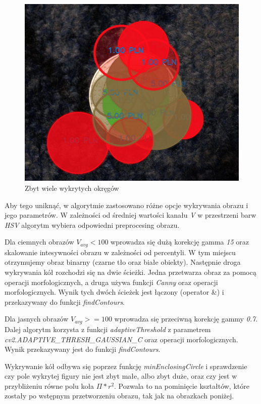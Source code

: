 \documentclass{mwart}
\begin{document}
\begin{figure}[H]
    \centering
    \includegraphics[width=\textwidth]{Objects.png}
    \caption{Zbyt wiele wykrytych okręgów}
\end{figure}

Aby tego uniknąć, w algorytmie zastosowano różne opcje wykrywania obrazu i jego parametrów. W zależności od średniej wartości kanału \textit{V} w przestrzeni barw \textit{HSV} algorytm wybiera odpowiedni preprocesing obrazu.

Dla ciemnych obrazów $V_{avg} < 100$ wprowadza się dużą korekcję gamma \textit{15} oraz skalowanie intesywności obrazu w zależności od percentyli.
W tym miejscu otrzymujemy obraz binarny (czarne tło oraz białe obiekty).
Następnie droga wykrywania kół rozchodzi się na dwie ścieżki. Jedna przetwarza obraz za pomocą operacji morfologicznych, a druga używa funkcji \textit{Canny} oraz operacji morfologicznych. Wynik tych dwóch ścieżek jest łączony (operator \&) i przekazywany do funkcji \textit{findContours}.

Dla jasnych obrazów $V_{avg} >= 100$ wprowadza się przeciwną korekcję gammy \textit{0.7}. Dalej algorytm korzysta z funkcji \textit{adaptiveThreshold} z parametrem \textit{cv2.ADAPTIVE\_THRESH\_GAUSSIAN\_C} oraz operacji morfologicznych. Wynik przekazywany jest do funkcji \textit{findContours}.

Wykrywanie kół odbywa się poprzez funkcję \textit{minEnclosingCircle} i sprawdzenie czy pole wykrytej figury nie jest zbyt małe, albo zbyt duże, oraz czy jest w przybliżeniu równe polu koła $\Pi * r^2$. Pozwala to na pominięcie kształtów, które zostały po wstępnym przetworzeniu obrazu, tak jak na obrazkach poniżej.
\end{document}
